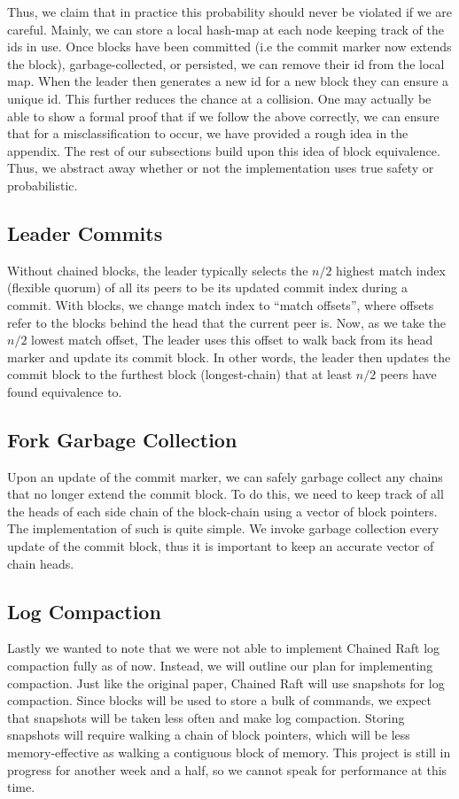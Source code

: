     Thus, we claim that in practice this probability should never be violated if we are careful. 
    Mainly, we can store a local hash-map at each node keeping track of the ids in use. 
    Once blocks have been committed (i.e the commit marker now extends the block), garbage-collected, or persisted, we can remove their id from the local map. 
    When the leader then generates a new id for a new block they can ensure a unique id. 
    This further reduces the chance at a collision. 
    One may actually be able to show a formal proof that if we follow the above correctly, we can ensure that for a misclassification to occur, we have provided a rough idea in the appendix. 
    The rest of our subsections build upon this idea of block equivalence. 
    Thus, we abstract away whether or not the implementation uses true safety or probabilistic.

\subsection{Leader Commits}
Without chained blocks, the leader typically selects the $n/2$ highest match index (flexible quorum) of all its peers to be its updated commit index during a commit. 
With blocks, we change match index to “match offsets”, where offsets refer to the blocks behind the head that the current peer is. 
Now, as we take the $n/2$ lowest match offset, The leader uses this offset to walk back from its head marker and update its commit block. 
In other words, the leader then updates the commit block to the furthest block (longest-chain) that at least $n/2$ peers have found equivalence to.

\subsection{Fork Garbage Collection}
Upon an update of the commit marker, we can safely garbage collect any chains that no longer extend the commit block. 
To do this, we need to keep track of all the heads of each side chain of the block-chain using a vector of block pointers. 
The implementation of such is quite simple. 
We invoke garbage collection every update of the commit block, thus it is important to keep an accurate vector of chain heads. 

\subsection{Log Compaction}
Lastly we wanted to note that we were not able to implement Chained Raft log compaction fully as of now. 
Instead, we will outline our plan for implementing compaction. 
Just like the original paper, Chained Raft will use snapshots for log compaction. 
Since blocks will be used to store a bulk of commands, we expect that snapshots will be taken less often and make log compaction. 
Storing snapshots will require walking a chain of block pointers, which will be less memory-effective as walking a contiguous block of memory.  
This project is still in progress for another week and a half, so we cannot speak for performance at this time.